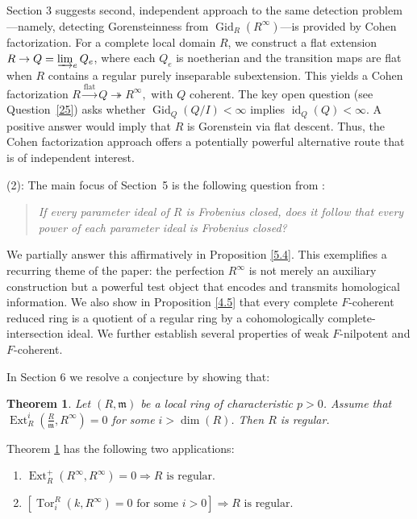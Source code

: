 \documentclass[11pt,a4paper]{amsart}
\numberwithin{equation}{section}
\newtheorem{theorem}{Theorem}[section]
\theoremstyle{definition}
\theoremstyle{remark}
\begin{document}
Section 3 suggests second, independent approach to the same detection problem—namely, detecting Gorensteinness from \(\operatorname{Gid}_R(R^\infty)\)—is provided by Cohen factorization. For a complete local domain \(R\), we construct a flat extension \(R \to Q = \varinjlim_e Q_e\), where each \(Q_e\) is noetherian and the transition maps are flat when \(R\) contains a regular purely inseparable subextension. This yields a Cohen factorization
\(
R \xrightarrow{\text{flat}} Q \twoheadrightarrow R^\infty,
\) with \(Q\) coherent. The key open question (see Question~\ref{25}) asks whether \(\operatorname{Gid}_Q(Q/I) < \infty\) implies \(\operatorname{id}_Q(Q) < \infty\). A positive answer would imply that \(R\) is Gorenstein via flat descent. Thus, the Cohen factorization approach offers a potentially powerful alternative route that is of independent interest.

\medskip


(2): The main focus of Section~5 is the following question from \cite{Al}:

\begin{quote}
	\emph{If every parameter ideal of \(R\) is Frobenius closed, does it follow that every power of each parameter ideal is Frobenius closed?}
\end{quote}

We partially answer this affirmatively in Proposition \ref{5.4}. This exemplifies a recurring theme of the paper: the perfection \(R^\infty\) is not merely an auxiliary construction but a powerful test object that encodes and transmits homological information.
We also show in Proposition \ref{4.5} that every complete \(F\)-coherent reduced ring is a quotient of a regular ring by a cohomologically complete-intersection ideal. 
We further establish several properties of weak \(F\)-nilpotent and \(F\)-coherent.



In Section 6 we resolve a conjecture \cite[Conjecture 5.19]{Elham} by showing that:
\begin{theorem}\label{18}
	Let $(R,\mathfrak m)$ be a local ring of characteristic $p>0$. 
	Assume that
	\(
	\operatorname{Ext}^{i}_{R}(\frac{R}{\mathfrak m},R^{\infty})=0
	\)
	for some $i>\dim(R)$. Then $R$ is regular.
\end{theorem}


Theorem \ref{18} has the following two applications:

\begin{enumerate}
	\item[(i)]
	\(
	\operatorname{Ext}^{+}_{R}(R^\infty,R^\infty)=0 \Longrightarrow 
	\text{$R$ is regular}.
	\)
	
	\item[(ii)]
	\(
	[\operatorname{Tor}^{R}_{i}(k,R^\infty)=0 \text{ for some } i>0] \Longrightarrow 
	\text{$R$ is regular}.
	\)
\end{enumerate}
\end{document}
